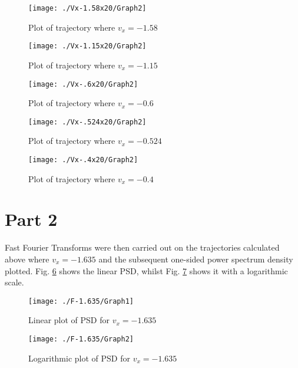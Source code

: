 \documentclass[a4paper,12pt]{article}
\begin{document}
\begin{figure}[H]
\centering
\texttt{[image: ./Vx-1.58x20/Graph2]}
\caption{Plot of trajectory where $v_x=-1.58$}
\label{fig:orbit5}
\end{figure}

\begin{figure}[H]
\centering
\texttt{[image: ./Vx-1.15x20/Graph2]}
\caption{Plot of trajectory where $v_x=-1.15$}
\label{fig:orbit6}
\end{figure}

\begin{figure}[H]
\centering
\texttt{[image: ./Vx-.6x20/Graph2]}
\caption{Plot of trajectory where $v_x=-0.6$}
\label{fig:orbit7}
\end{figure}

\begin{figure}[H]
\centering
\texttt{[image: ./Vx-.524x20/Graph2]}
\caption{Plot of trajectory where $v_x=-0.524$}
\label{fig:orbit8}
\end{figure}

\begin{figure}[H]
\centering
\texttt{[image: ./Vx-.4x20/Graph2]}
\caption{Plot of trajectory where $v_x=-0.4$}
\label{fig:orbit9}
\end{figure}


\newpage
\section{Part 2}
Fast Fourier Transforms were then carried out on the trajectories calculated above where $v_x=-1.635$ and the subsequent one-sided power spectrum density plotted. Fig. \ref{fig:psd1} shows the linear PSD, whilst Fig. \ref{fig:psd2} shows it with a logarithmic scale.

\begin{figure}[H]
\centering
\texttt{[image: ./F-1.635/Graph1]}
\caption{Linear plot of PSD for $v_x=-1.635$}
\label{fig:psd1}
\end{figure}

\begin{figure}[H]
\centering
\texttt{[image: ./F-1.635/Graph2]}
\caption{Logarithmic plot of PSD for $v_x=-1.635$}
\label{fig:psd2}
\end{figure}
\end{document}
